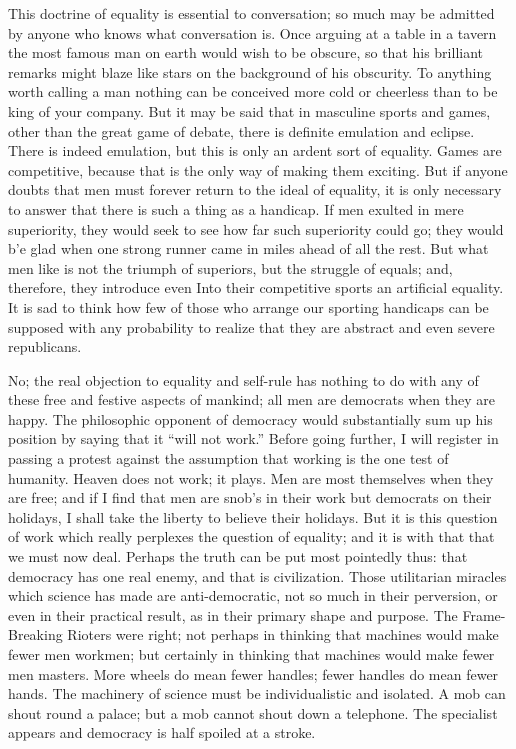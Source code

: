 \documentclass{book}
\begin{document}
This doctrine of equality is essential to conversation; so much may be admitted by anyone who knows what conversation is. Once arguing at a table in a tavern the most famous man on earth would wish to be obscure, so that his brilliant remarks might blaze like stars on the background of his obscurity. To anything worth calling a man nothing can be conceived more cold or cheerless than to be king of your company. But it may be said that in masculine sports and games, other than the great game of debate, there is definite emulation and eclipse. There is indeed emulation, but this is only an ardent sort of equality. Games are competitive, because that is the only way of making them exciting. But if anyone doubts that men must forever return to the ideal of equality, it is only necessary to answer that there is such a thing as a handicap. If men exulted in mere superiority, they would seek to see how far such superiority could go; they would b’e glad when one strong runner came in miles ahead of all the rest. But what men like is not the triumph of superiors, but the struggle of equals; and, therefore, they introduce even Into their competitive sports an artificial equality. It is sad to think how few of those who arrange our sporting handicaps can be supposed with any probability to realize that they are abstract and even severe republicans.

No; the real objection to equality and self-rule has nothing to do with any of these free and festive aspects of mankind; all men are democrats when they are happy. The philosophic opponent of democracy would substantially sum up his position by saying that it “will not work.” Before going further, I will register in passing a protest against the assumption that working is the one test of humanity. Heaven does not work; it plays. Men are most themselves when they are free; and if I find that men are snob’s in their work but democrats on their holidays, I shall take the liberty to believe their holidays. But it is this question of work which really perplexes the question of equality; and it is with that that we must now deal. Perhaps the truth can be put most pointedly thus: that democracy has one real enemy, and that is civilization. Those utilitarian miracles which science has made are anti-democratic, not so much in their perversion, or even in their practical result, as in their primary shape and purpose. The Frame-Breaking Rioters were right; not perhaps in thinking that machines would make fewer men workmen; but certainly in thinking that machines would make fewer men masters. More wheels do mean fewer handles; fewer handles do mean fewer hands. The machinery of science must be individualistic and isolated. A mob can shout round a palace; but a mob cannot shout down a telephone. The specialist appears and democracy is half spoiled at a stroke.
\end{document}
